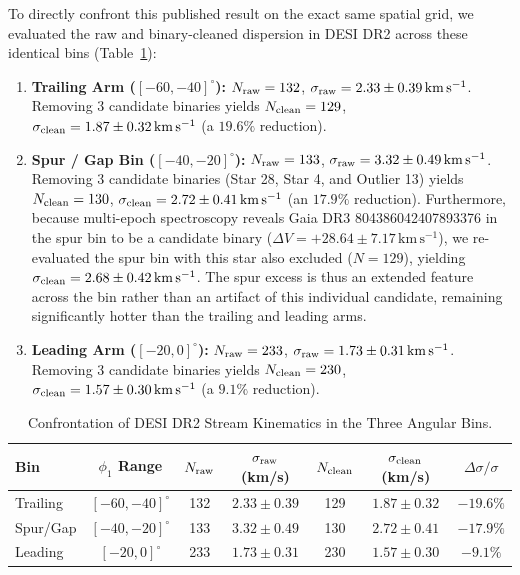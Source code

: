 \documentclass[twocolumn]{aastex631}
\begin{document}
To directly confront this published result on the exact same spatial grid, we evaluated the raw and binary-cleaned dispersion in DESI DR2 across these identical bins (Table~\ref{tab:nibauer}):
\begin{enumerate}
\item \textbf{Trailing Arm ($[-60, -40]^\circ$):} $N_{\rm raw} = 132$, $\sigma_{\rm raw} = 2.33 \pm 0.39\,\mathrm{km\,s^{-1}}$. Removing 3 candidate binaries yields $N_{\rm clean} = 129$, $\sigma_{\rm clean} = 1.87 \pm 0.32\,\mathrm{km\,s^{-1}}$ (a $19.6\%$ reduction).
\item \textbf{Spur / Gap Bin ($[-40, -20]^\circ$):} $N_{\rm raw} = 133$, $\sigma_{\rm raw} = 3.32 \pm 0.49\,\mathrm{km\,s^{-1}}$. Removing 3 candidate binaries (Star 28, Star 4, and Outlier 13) yields $N_{\rm clean} = 130$, $\sigma_{\rm clean} = 2.72 \pm 0.41\,\mathrm{km\,s^{-1}}$ (an $17.9\%$ reduction). Furthermore, because multi-epoch spectroscopy reveals Gaia DR3 804386042407893376 in the spur bin to be a candidate binary ($\Delta V = +28.64 \pm 7.17\,\mathrm{km\,s^{-1}}$), we re-evaluated the spur bin with this star also excluded ($N = 129$), yielding $\sigma_{\rm clean} = 2.68 \pm 0.42\,\mathrm{km\,s^{-1}}$. The spur excess is thus an extended feature across the bin rather than an artifact of this individual candidate, remaining significantly hotter than the trailing and leading arms.
\item \textbf{Leading Arm ($[-20, 0]^\circ$):} $N_{\rm raw} = 233$, $\sigma_{\rm raw} = 1.73 \pm 0.31\,\mathrm{km\,s^{-1}}$. Removing 3 candidate binaries yields $N_{\rm clean} = 230$, $\sigma_{\rm clean} = 1.57 \pm 0.30\,\mathrm{km\,s^{-1}}$ (a $9.1\%$ reduction).
\end{enumerate}

\begin{table}[t]
\centering
\small
\caption{Confrontation of DESI DR2 Stream Kinematics in the Three \citet{Nibauer2026} Angular Bins.}
\begin{tabular}{lcccccc}
\toprule
Bin & $\phi_1$ Range & $N_{\rm raw}$ & $\sigma_{\rm raw}$ (km/s) & $N_{\rm clean}$ & $\sigma_{\rm clean}$ (km/s) & $\Delta \sigma / \sigma$ \\
\midrule
Trailing & $[-60, -40]^\circ$ & 132 & $2.33 \pm 0.39$ & 129 & $1.87 \pm 0.32$ & $-19.6\%$ \\
Spur/Gap & $[-40, -20]^\circ$ & 133 & $3.32 \pm 0.49$ & 130 & $2.72 \pm 0.41$ & $-17.9\%$ \\
Leading  & $[-20, 0]^\circ$   & 233 & $1.73 \pm 0.31$ & 230 & $1.57 \pm 0.30$ & $-9.1\%$ \\
\bottomrule
\end{tabular}
\label{tab:nibauer}
\end{table}
\end{document}
